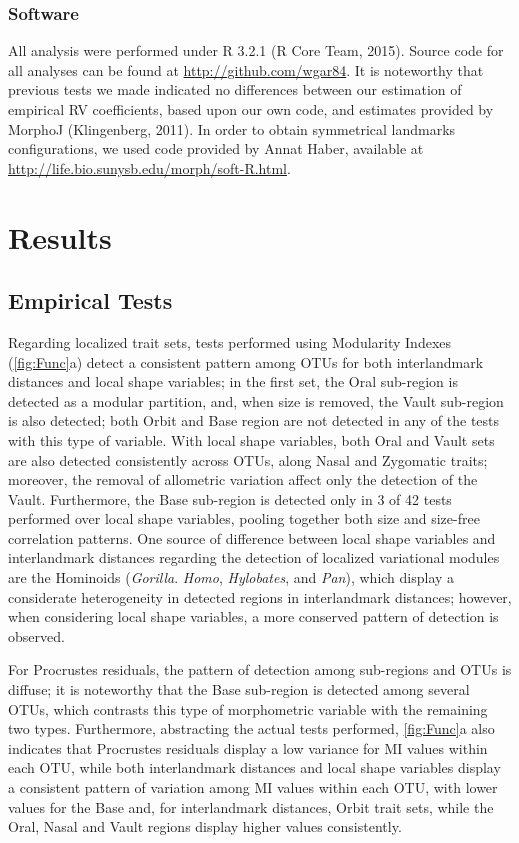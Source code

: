 \documentclass[12pt,]{article}
\begin{document}
\subsubsection{Software}\label{software}

All analysis were performed under R 3.2.1 (R Core Team, 2015). Source
code for all analyses can be found at \url{http://github.com/wgar84}. It
is noteworthy that previous tests we made indicated no differences
between our estimation of empirical RV coefficients, based upon our own
code, and estimates provided by MorphoJ (Klingenberg, 2011). In order to
obtain symmetrical landmarks configurations, we used code provided by
Annat Haber, available at
\url{http://life.bio.sunysb.edu/morph/soft-R.html}.

\section{Results}\label{results}

\subsection{Empirical Tests}\label{empirical-tests}

Regarding localized trait sets, tests performed using Modularity Indexes
(\autoref{fig:Func}a) detect a consistent pattern among OTUs for both
interlandmark distances and local shape variables; in the first set, the
Oral sub-region is detected as a modular partition, and, when size is
removed, the Vault sub-region is also detected; both Orbit and Base
region are not detected in any of the tests with this type of variable.
With local shape variables, both Oral and Vault sets are also detected
consistently across OTUs, along Nasal and Zygomatic traits; moreover,
the removal of allometric variation affect only the detection of the
Vault. Furthermore, the Base sub-region is detected only in 3 of 42
tests performed over local shape variables, pooling together both size
and size-free correlation patterns. One source of difference between
local shape variables and interlandmark distances regarding the
detection of localized variational modules are the Hominoids
(\emph{Gorilla}. \emph{Homo}, \emph{Hylobates}, and \emph{Pan}), which
display a considerate heterogeneity in detected regions in interlandmark
distances; however, when considering local shape variables, a more
conserved pattern of detection is observed.

For Procrustes residuals, the pattern of detection among sub-regions and
OTUs is diffuse; it is noteworthy that the Base sub-region is detected
among several OTUs, which contrasts this type of morphometric variable
with the remaining two types. Furthermore, abstracting the actual tests
performed, \autoref{fig:Func}a also indicates that Procrustes residuals
display a low variance for MI values within each OTU, while both
interlandmark distances and local shape variables display a consistent
pattern of variation among MI values within each OTU, with lower values
for the Base and, for interlandmark distances, Orbit trait sets, while
the Oral, Nasal and Vault regions display higher values consistently.
\end{document}
